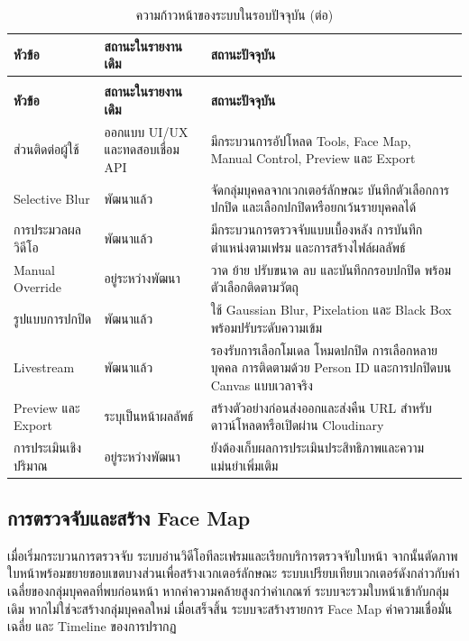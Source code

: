 \small
\setlength{\LTcapwidth}{\textwidth}
\begin{longtable}{|p{}|p{}|p{}|}
\caption{ความก้าวหน้าของระบบในรอบปัจจุบัน}
\label{tab:progress-update}\\
\hline
\textbf{หัวข้อ} & \textbf{สถานะในรายงานเดิม} & \textbf{สถานะปัจจุบัน} \\
\hline
\endfirsthead
\caption[]{ความก้าวหน้าของระบบในรอบปัจจุบัน (ต่อ)}\\
\hline
\textbf{หัวข้อ} & \textbf{สถานะในรายงานเดิม} & \textbf{สถานะปัจจุบัน} \\
\hline
\endhead
ส่วนติดต่อผู้ใช้ & ออกแบบ UI/UX และทดสอบเชื่อม API & มีกระบวนการอัปโหลด Tools, Face Map, Manual Control, Preview และ Export \\
\hline
Selective Blur & พัฒนาแล้ว & จัดกลุ่มบุคคลจากเวกเตอร์ลักษณะ บันทึกตัวเลือกการปกปิด และเลือกปกปิดหรือยกเว้นรายบุคคลได้ \\
\hline
การประมวลผลวิดีโอ & พัฒนาแล้ว & มีกระบวนการตรวจจับแบบเบื้องหลัง การบันทึกตำแหน่งตามเฟรม และการสร้างไฟล์ผลลัพธ์ \\
\hline
Manual Override & อยู่ระหว่างพัฒนา & วาด ย้าย ปรับขนาด ลบ และบันทึกกรอบปกปิด พร้อมตัวเลือกติดตามวัตถุ \\
\hline
รูปแบบการปกปิด & พัฒนาแล้ว & ใช้ Gaussian Blur, Pixelation และ Black Box พร้อมปรับระดับความเข้ม \\
\hline
Livestream & พัฒนาแล้ว & รองรับการเลือกโมเดล โหมดปกปิด การเลือกหลายบุคคล การติดตามด้วย Person ID และการปกปิดบน Canvas แบบเวลาจริง \\
\hline
Preview และ Export & ระบุเป็นหน้าผลลัพธ์ & สร้างตัวอย่างก่อนส่งออกและส่งคืน URL สำหรับดาวน์โหลดหรือเปิดผ่าน Cloudinary \\
\hline
การประเมินเชิงปริมาณ & อยู่ระหว่างพัฒนา & ยังต้องเก็บผลการประเมินประสิทธิภาพและความแม่นยำเพิ่มเติม \\
\hline
\end{longtable}

\subsection{การตรวจจับและสร้าง Face Map}

เมื่อเริ่มกระบวนการตรวจจับ ระบบอ่านวิดีโอทีละเฟรมและเรียกบริการตรวจจับใบหน้า จากนั้นตัดภาพใบหน้าพร้อมขยายขอบเขตบางส่วนเพื่อสร้างเวกเตอร์ลักษณะ ระบบเปรียบเทียบเวกเตอร์ดังกล่าวกับค่าเฉลี่ยของกลุ่มบุคคลที่พบก่อนหน้า หากค่าความคล้ายสูงกว่าค่าเกณฑ์ ระบบจะรวมใบหน้าเข้ากับกลุ่มเดิม หากไม่ใช่จะสร้างกลุ่มบุคคลใหม่ เมื่อเสร็จสิ้น ระบบจะสร้างรายการ Face Map ค่าความเชื่อมั่นเฉลี่ย และ Timeline ของการปรากฏ

